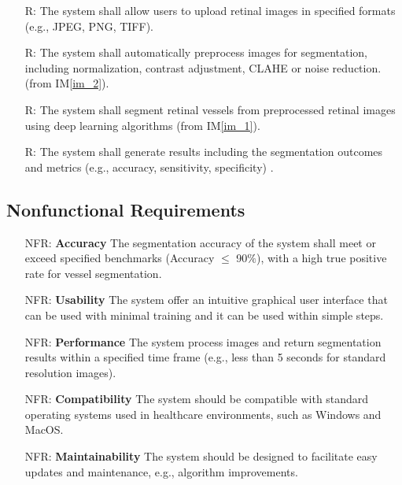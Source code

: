 \documentclass[12pt]{article}
\newcommand{\iref}[1]{IM\ref{#1}}
\newcounter{reqnum} %
\newcounter{nfrnum} %
\begin{document}
\noindent 

\begin{itemize}

\item[R\refstepcounter{reqnum}\thereqnum \label{R_1}:]  The system shall allow users to upload retinal images in specified formats (e.g., JPEG, PNG, TIFF).
\item[R\refstepcounter{reqnum}\thereqnum \label{R_2}:]
The system shall automatically preprocess images for segmentation, including normalization, contrast adjustment, CLAHE or noise reduction.(from \iref{im_2}).

\item[R\refstepcounter{reqnum}\thereqnum \label{R_3}:] The system shall segment retinal vessels from preprocessed retinal images using deep learning algorithms (from \iref{im_1}).

\item[R\refstepcounter{reqnum}\thereqnum \label{R_4}:] The system shall generate results including the segmentation outcomes and metrics (e.g., accuracy, sensitivity, specificity) .

\end{itemize}


\subsection{Nonfunctional Requirements}


\noindent 

\begin{itemize}

\item[NFR\refstepcounter{nfrnum}\thenfrnum \label{NFR_Accuracy}:]
  \textbf{Accuracy} The segmentation accuracy of the system shall meet or exceed specified benchmarks (Accuracy $\leq$ 90$\%$), with a high true positive rate for vessel segmentation.
\item[NFR\refstepcounter{nfrnum}\thenfrnum \label{NFR_Usability}:] \textbf{Usability} The system offer an intuitive graphical user interface that can be used with minimal training and it can be used within simple steps.

\item[NFR\refstepcounter{nfrnum}\thenfrnum \label{NFR_Performance}:] \textbf{Performance} The system process images and return segmentation results within a specified time frame (e.g., less than 5 seconds for standard resolution images).

\item[NFR\refstepcounter{nfrnum}\thenfrnum \label{NFR_Compatibility}:] \textbf{Compatibility} The system should be compatible with standard operating systems used in healthcare environments, such as Windows and MacOS.

\item[NFR\refstepcounter{nfrnum}\thenfrnum \label{NFR_Compatibility}:] \textbf{Maintainability} The system should be designed to facilitate easy updates and maintenance, e.g., algorithm improvements.

\end{itemize}
\end{document}
